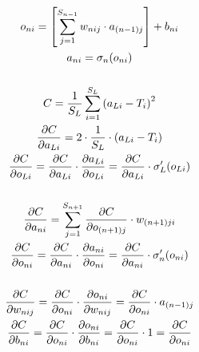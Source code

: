 \documentclass[12pt]{article}
\begin{document}
\pagebreak

\begin{gather*}
    o_{ni} = \qty[\sum_{j = 1}^{S_{n - 1}} w_{nij} \cdot a_{(n-1)j}] + b_{ni} \\
    a_{ni} = \sigma_n(o_{ni}) \\
    \\
    C = \frac{1}{S_L} \sum_{i=1}^{S_L} \qty(a_{Li} - T_{i})^2 \\
    \frac{\partial C}{\partial a_{Li}} = 2\cdot\frac{1}{S_L}\cdot\qty(a_{Li} - T_{i}) \\
    \frac{\partial C}{\partial o_{Li}} = \frac{\partial C}{\partial a_{Li}} \cdot \frac{\partial a_{Li}}{\partial o_{Li}} = \frac{\partial C}{\partial a_{Li}}\cdot \sigma_L ^\prime\qty(o_{Li}) \\
    \\
    \frac{\partial C}{\partial a_{ni}} = \sum_{j=1}^{S_{n+1}} \frac{\partial C}{\partial o_{(n+1)j}}\cdot w_{(n+1)ji}\\
    \frac{\partial C}{\partial o_{ni}} = \frac{\partial C}{\partial a_{ni}} \cdot \frac{\partial a_{ni}}{\partial o_{ni}} = \frac{\partial C}{\partial a_{ni}} \cdot \sigma_n ^ \prime \qty(o_{ni}) \\
    \\
    \frac{\partial C}{\partial w_{nij}} = \frac{\partial C}{\partial o_{ni}} \cdot \frac{\partial o_{ni}}{\partial w_{nij}} = \frac{\partial C}{\partial o_{ni}} \cdot a_{(n-1)j} \\
    \frac{\partial C}{\partial b_{ni}} = \frac{\partial C}{\partial o_{ni}} \cdot \frac{\partial o_{ni}}{\partial b_{ni}} = \frac{\partial C}{\partial o_{ni}} \cdot 1 = \frac{\partial C}{\partial o_{ni}}\\
\end{gather*}
\end{document}
